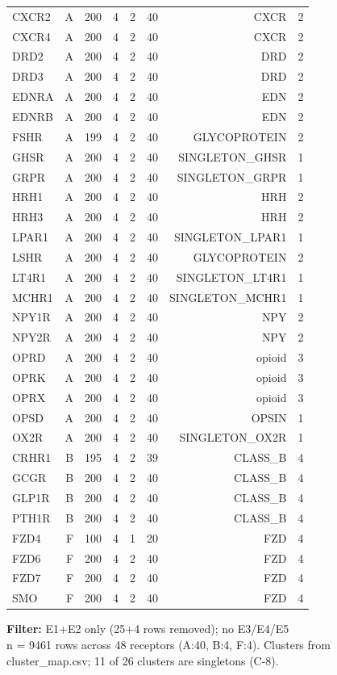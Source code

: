 \begin{longtable}{lrrrrrrr}
CXCR2 & A & 200 & 4 & 2 & 40 & CXCR & 2 \\
CXCR4 & A & 200 & 4 & 2 & 40 & CXCR & 2 \\
DRD2 & A & 200 & 4 & 2 & 40 & DRD & 2 \\
DRD3 & A & 200 & 4 & 2 & 40 & DRD & 2 \\
EDNRA & A & 200 & 4 & 2 & 40 & EDN & 2 \\
EDNRB & A & 200 & 4 & 2 & 40 & EDN & 2 \\
FSHR & A & 199 & 4 & 2 & 40 & GLYCOPROTEIN & 2 \\
GHSR & A & 200 & 4 & 2 & 40 & SINGLETON\_GHSR & 1 \\
GRPR & A & 200 & 4 & 2 & 40 & SINGLETON\_GRPR & 1 \\
HRH1 & A & 200 & 4 & 2 & 40 & HRH & 2 \\
HRH3 & A & 200 & 4 & 2 & 40 & HRH & 2 \\
LPAR1 & A & 200 & 4 & 2 & 40 & SINGLETON\_LPAR1 & 1 \\
LSHR & A & 200 & 4 & 2 & 40 & GLYCOPROTEIN & 2 \\
LT4R1 & A & 200 & 4 & 2 & 40 & SINGLETON\_LT4R1 & 1 \\
MCHR1 & A & 200 & 4 & 2 & 40 & SINGLETON\_MCHR1 & 1 \\
NPY1R & A & 200 & 4 & 2 & 40 & NPY & 2 \\
NPY2R & A & 200 & 4 & 2 & 40 & NPY & 2 \\
OPRD & A & 200 & 4 & 2 & 40 & opioid & 3 \\
OPRK & A & 200 & 4 & 2 & 40 & opioid & 3 \\
OPRX & A & 200 & 4 & 2 & 40 & opioid & 3 \\
OPSD & A & 200 & 4 & 2 & 40 & OPSIN & 1 \\
OX2R & A & 200 & 4 & 2 & 40 & SINGLETON\_OX2R & 1 \\
CRHR1 & B & 195 & 4 & 2 & 39 & CLASS\_B & 4 \\
GCGR & B & 200 & 4 & 2 & 40 & CLASS\_B & 4 \\
GLP1R & B & 200 & 4 & 2 & 40 & CLASS\_B & 4 \\
PTH1R & B & 200 & 4 & 2 & 40 & CLASS\_B & 4 \\
FZD4 & F & 100 & 4 & 1 & 20 & FZD & 4 \\
FZD6 & F & 200 & 4 & 2 & 40 & FZD & 4 \\
FZD7 & F & 200 & 4 & 2 & 40 & FZD & 4 \\
SMO & F & 200 & 4 & 2 & 40 & FZD & 4 \\
\end{longtable}
\begin{flushleft}\scriptsize
\textbf{Filter:} E1+E2 only (25+4 rows removed); no E3/E4/E5
 \\ n = 9461 rows across 48 receptors (A:40, B:4, F:4). Clusters from cluster\_map.csv; 11 of 26 clusters are singletons (C-8).
\end{flushleft}
\endgroup
